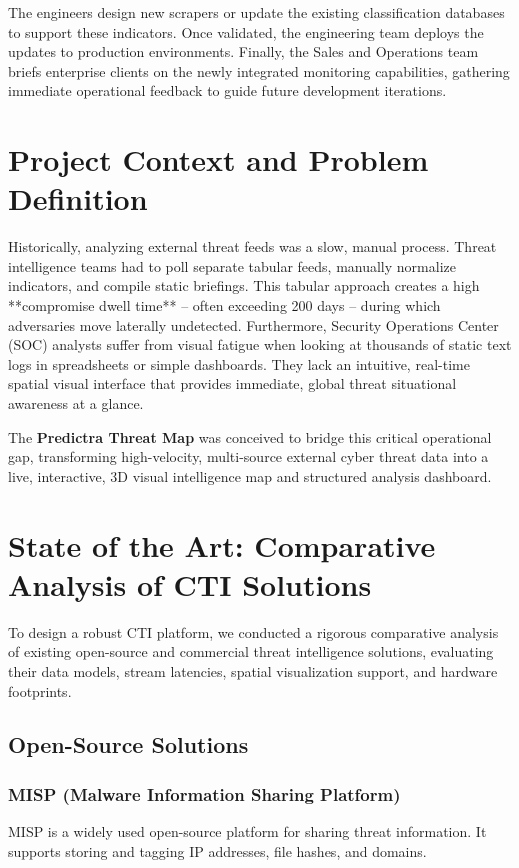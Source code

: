 The engineers design new scrapers or update the existing classification databases to support these indicators. Once validated, the engineering team deploys the updates to production environments. Finally, the Sales and Operations team briefs enterprise clients on the newly integrated monitoring capabilities, gathering immediate operational feedback to guide future development iterations.

\section{Project Context and Problem Definition}

Historically, analyzing external threat feeds was a slow, manual process. Threat intelligence teams had to poll separate tabular feeds, manually normalize indicators, and compile static briefings. This tabular approach creates a high **compromise dwell time** -- often exceeding 200 days -- during which adversaries move laterally undetected. Furthermore, Security Operations Center (SOC) analysts suffer from visual fatigue when looking at thousands of static text logs in spreadsheets or simple dashboards. They lack an intuitive, real-time spatial visual interface that provides immediate, global threat situational awareness at a glance.

The \textbf{Predictra Threat Map} was conceived to bridge this critical operational gap, transforming high-velocity, multi-source external cyber threat data into a live, interactive, 3D visual intelligence map and structured analysis dashboard.

\section{State of the Art: Comparative Analysis of CTI Solutions}
To design a robust CTI platform, we conducted a rigorous comparative analysis of existing open-source and commercial threat intelligence solutions, evaluating their data models, stream latencies, spatial visualization support, and hardware footprints.

\subsection{Open-Source Solutions}

\subsubsection{MISP (Malware Information Sharing Platform)}
MISP is a widely used open-source platform for sharing threat information. It supports storing and tagging IP addresses, file hashes, and domains.

